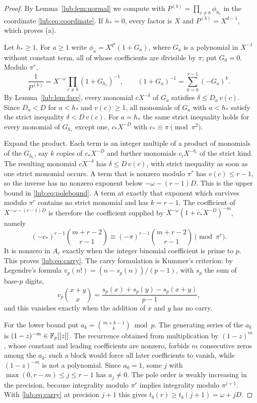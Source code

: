 \begin{proof}
By Lemma~\ref{lub:lem:normal} we compute with $P^{(b)}=\prod_{c\ne b}\phi_{h_c}$ in the
coordinate \eqref{lub:eq:coordinate}. If $h_*=0$, every factor is $X$ and
$P^{(b)}=X^{d-1}$, which proves (a).

Let $h_*\ge1$. For $a\ge1$ write $\phi_a=X^{q^a}(1+G_a)$, where $G_a$ is a polynomial in
$X^{-1}$ without constant term, all of whose coefficients are divisible by $\pi$; put
$G_0=0$. Modulo $\pi^r$,
\[
 \frac1{P^{(b)}}=X^{-\omega}\prod_{c\ne b}(1+G_{h_c})^{-1},\qquad
 (1+G_a)^{-1}=\sum_{k=0}^{r-1}(-G_a)^k .
\]
By Lemma~\ref{lub:lem:face}, every monomial $cX^{-\delta}$ of $G_a$ satisfies
$\delta\le D_a\,v(c)$. Since $D_a<D$ for $a<h_*$ and $v(c)\ge1$, all monomials of $G_a$
with $a<h_*$ satisfy the strict inequality $\delta<D\,v(c)$. For $a=h_*$ the same strict
inequality holds for every monomial of $G_{h_*}$ except one, $c_*X^{-D}$ with
$c_*\equiv\pi\pmod{\pi^2}$.

Expand the product. Each term is an integer multiple of a product of monomials of the
$G_{h_c}$, say $k$ copies of $c_*X^{-D}$ and further monomials $c_iX^{-\delta_i}$ of the
strict kind. The resulting monomial $cX^{-\delta}$ has $\delta\le D\,v(c)$, with strict
inequality as soon as one strict monomial occurs. A term that is nonzero modulo $\pi^r$ has
$v(c)\le r-1$, so the inverse has no nonzero exponent below $-\omega-(r-1)D$. This is the
upper bound in \eqref{lub:eq:polebound}. A term at exactly that exponent which survives
modulo $\pi^r$ contains no strict monomial and has $k=r-1$. The coefficient of
$X^{-\omega-(r-1)D}$ is therefore the coefficient supplied by
$X^{-\omega}(1+c_*X^{-D})^{-m}$, namely
\begin{equation}\label{lub:eq:topcoefficient}
 (-c_*)^{r-1}\binom{m+r-2}{r-1}\equiv(-\pi)^{r-1}\binom{m+r-2}{r-1}\pmod{\pi^r}.
\end{equation}
It is nonzero in $A_r$ exactly when the integer binomial coefficient is prime to $p$. This
proves \eqref{lub:eq:carry}. The carry formulation is Kummer's criterion: by
Legendre's formula $v_p(n!)=(n-s_p(n))/(p-1)$, with $s_p$ the sum of base-$p$ digits,
\[
 v_p\binom{x+y}{x}=\frac{s_p(x)+s_p(y)-s_p(x+y)}{p-1},
\]
and this vanishes exactly when the addition of $x$ and $y$ has no carry.

For the lower bound put $a_k=\binom{m+k-1}{k}\bmod p$. The generating series of the $a_k$
is $(1-z)^{-m}\in\mathbb{F}_p[[z]]$. The recurrence obtained from multiplication by $(1-z)^m$,
whose constant and leading coefficients are nonzero, forbids $m$ consecutive zeros among
the $a_k$: such a block would force all later coefficients to vanish, while $(1-z)^{-m}$ is
not a polynomial. Since $a_0=1$, some $j$ with $\max(0,r-m)\le j\le r-1$ has $a_j\ne0$.
The pole order is weakly increasing in the precision, because integrality modulo $\pi^r$
implies integrality modulo $\pi^{j+1}$. With \eqref{lub:eq:carry} at precision $j+1$ this
gives $t_b(r)\ge t_b(j+1)=\omega+jD$.
\end{proof}

